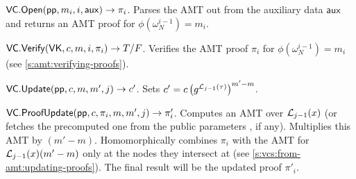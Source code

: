 \api $\mathsf{VC.Open}(\mathsf{pp}, m_i, i, \mathsf{aux}) \rightarrow \pi_i$.
Parses the AMT out from the auxiliary data $\mathsf{aux}$ and returns an AMT proof for $\phi(\omega_N^{i-1})=m_i$.

\api $\mathsf{VC.Verify}(\mathsf{VK}, c, m, i, \pi_i) \rightarrow T/F$.
Verifies the AMT proof $\pi_i$ for $\phi(\omega_N^{i-1})=m_i$ (see \cref{s:amt:verifying-proofs}).

\api $\mathsf{VC.Update}(\mathsf{pp}, c, m, m', j)\rightarrow c'$.
Sets $c' = c \left(g^{\mathcal{L}_{j-1}(\tau)}\right)^{m'-m}$.

\api $\mathsf{VC.ProofUpdate}(\mathsf{pp}, c, \pi_i, m, m', j)\rightarrow \pi'_i$.
Computes an AMT over $\mathcal{L}_{j-1}(x)$ (or fetches the precomputed one from the public parameters \pp, if any).
Multiplies this AMT by $(m'-m)$.
Homomorphically combines $\pi_i$ with the AMT for $\mathcal{L}_{j-1}(x)(m'-m)$ only at the nodes they intersect at (see \cref{s:vcs:from-amt:updating-proofs}).
The final result will be the updated proof $\pi'_i$.
